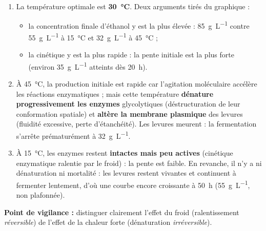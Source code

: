 \documentclass[11pt]{article}
\begin{document}
\begin{corrige}
\begin{enumerate}
\item La température optimale est \textbf{\SI{30}{\degreeCelsius}}. Deux arguments tirés du graphique :
\begin{itemize}
\item la concentration finale d'éthanol y est la plus élevée : \SI{85}{g\per\liter} contre \SI{55}{g\per\liter} à \SI{15}{\degreeCelsius} et \SI{32}{g\per\liter} à \SI{45}{\degreeCelsius} ;
\item la cinétique y est la plus rapide : la pente initiale est la plus forte (environ \SI{35}{g\per\liter} atteints dès \SI{20}{h}).
\end{itemize}
\item À \SI{45}{\degreeCelsius}, la production initiale est rapide car l'agitation moléculaire accélère les réactions enzymatiques ; mais cette température \textbf{dénature progressivement les enzymes} glycolytiques (déstructuration de leur conformation spatiale) et \textbf{altère la membrane plasmique} des levures (fluidité excessive, perte d'étanchéité). Les levures meurent : la fermentation s'arrête prématurément à \SI{32}{g\per\liter}.
\item À \SI{15}{\degreeCelsius}, les enzymes restent \textbf{intactes mais peu actives} (cinétique enzymatique ralentie par le froid) : la pente est faible. En revanche, il n'y a ni dénaturation ni mortalité : les levures restent vivantes et continuent à fermenter lentement, d'où une courbe encore croissante à \SI{50}{h} (\SI{55}{g\per\liter}, non plafonnée).
\end{enumerate}
\textbf{Point de vigilance :} distinguer clairement l'effet du froid (ralentissement \emph{réversible}) de l'effet de la chaleur forte (dénaturation \emph{irréversible}).
\end{corrige}
\end{document}
